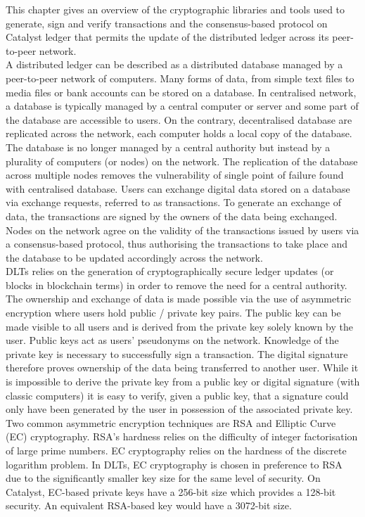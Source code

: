 This chapter gives an overview of the cryptographic libraries and tools used to generate, sign and verify transactions and the consensus-based protocol on Catalyst ledger that permits the update of the distributed ledger across its peer-to-peer network. \\

A distributed ledger can be described as a distributed database managed by a peer-to-peer network of computers. Many forms of data, from simple text files to media files or bank accounts can be stored on a database. In centralised network, a database is typically managed by a central computer or server and some part of the database are accessible to users. On the contrary, decentralised database are replicated across the network, each computer holds a local copy of the database. The database is no longer managed by a central authority but instead by a plurality of computers (or nodes) on the network. The replication of the database across multiple nodes removes the vulnerability of single point of failure found with centralised database. Users can exchange digital data stored on a database via exchange requests, referred to as transactions. To generate an exchange of data, the transactions are signed by the owners of the data being exchanged. Nodes on the network agree on the validity of the transactions issued by users via a consensus-based protocol, thus authorising the transactions to take place and the database to be updated accordingly across the network. \\

DLTs relies on the generation of cryptographically secure ledger updates (or blocks in blockchain terms) in order to remove the need for a central authority. The ownership and exchange of data is made possible via the use of asymmetric encryption where users hold public / private key pairs. The public key can be made visible to all users and is derived from the private key solely known by the user. Public keys act as users' pseudonyms on the network. Knowledge of the private key is necessary to successfully sign a transaction. The digital signature therefore proves ownership of the data being transferred to another user. While it is impossible to derive the private key from a public key or digital signature (with classic computers) it is easy to verify, given a public key, that a signature could only have been generated by the user in possession of the associated private key. \\

Two common asymmetric encryption techniques are RSA and Elliptic Curve (EC) cryptography. RSA's hardness relies on the difficulty of integer factorisation of large prime numbers. EC cryptography relies on the hardness of the discrete logarithm problem. In DLTs, EC cryptography is chosen in preference to RSA due to the significantly smaller key size for the same level of security. On Catalyst, EC-based private keys have a 256-bit size which provides a 128-bit security. An equivalent RSA-based key would have a 3072-bit size.

